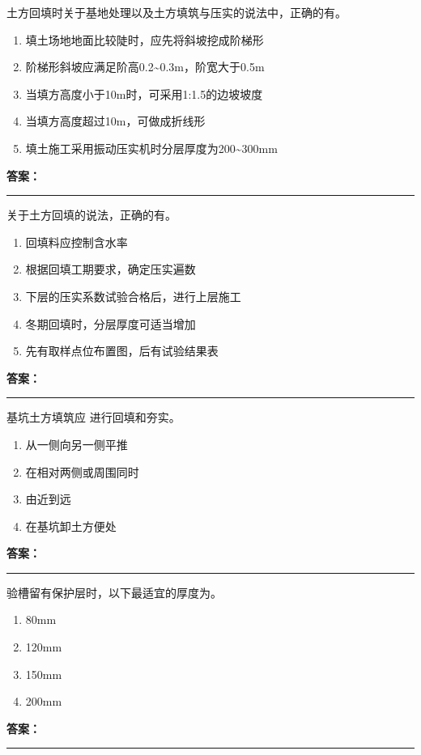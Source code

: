 \documentclass[UTF8,fontset=fandol,11pt]{ctexart}
\newcommand{\answerline}{\textcolor{answerred}{\rule{2.4cm}{0.7pt}}}
\begin{document}
\begin{quizbox}[title={第 19 题}]
土方回填时关于基地处理以及土方填筑与压实的说法中，正确的有。\\
\begin{enumerate}[label=\Alph*.]
\item 填土场地地面比较陡时，应先将斜坡挖成阶梯形
\item 阶梯形斜坡应满足阶高0.2\textasciitilde{}0.3m，阶宽大于0.5m
\item 当填方高度小于10m时，可采用1:1.5的边坡坡度
\item 当填方高度超过10m，可做成折线形
\item 填土施工采用振动压实机时分层厚度为200\textasciitilde{}300mm
\end{enumerate}
\textbf{\textcolor{answerred}{答案：}} \answerline
\end{quizbox}

\begin{quizbox}[title={第 20 题}]
关于土方回填的说法，正确的有。\\
\begin{enumerate}[label=\Alph*.]
\item 回填料应控制含水率
\item 根据回填工期要求，确定压实遍数
\item 下层的压实系数试验合格后，进行上层施工
\item 冬期回填时，分层厚度可适当增加
\item 先有取样点位布置图，后有试验结果表
\end{enumerate}
\textbf{\textcolor{answerred}{答案：}} \answerline
\end{quizbox}

\begin{quizbox}[title={第 21 题}]
基坑土方填筑应 进行回填和夯实。\\
\begin{enumerate}[label=\Alph*.]
\item 从一侧向另一侧平推
\item 在相对两侧或周围同时
\item 由近到远
\item 在基坑卸土方便处
\end{enumerate}
\textbf{\textcolor{answerred}{答案：}} \answerline
\end{quizbox}

\begin{quizbox}[title={第 22 题}]
验槽留有保护层时，以下最适宜的厚度为。\\
\begin{enumerate}[label=\Alph*.]
\item 80mm
\item 120mm
\item 150mm
\item 200mm
\end{enumerate}
\textbf{\textcolor{answerred}{答案：}} \answerline
\end{quizbox}
\end{document}

